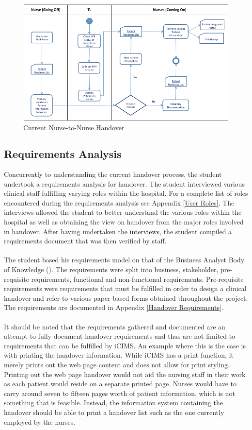\begin{figure}[hp]
				\centering
				\includegraphics[angle=-90,scale=1.0, width=120mm]{Images/Nurse-to-Nurse-Handover-Process-As-Is}
				\caption{Current Nurse-to-Nurse Handover}
\end{figure} 
\newpage

\subsection{Requirements Analysis}
Concurrently to understanding the current handover process, the student undertook a requirements analysis for handover. The student interviewed various clinical staff fulfilling varying roles within the hospital. For a complete list of roles encountered during the requirements analysis see Appendix \ref{User Roles}. The interviews allowed the student to better understand the various roles within the hospital as well as obtaining the view on handover from the major roles involved in handover. After having undertaken the interviews, the student compiled a requirements document that was then verified by staff. 
\\ \\ 
The student based his requirements model on that of the Business Analyst Body of Knowledge (\cite{IIBA}). The requirements were split into business, stakeholder, pre-requisite requirements, functional and non-functional requirements. Pre-requisite requirements were requirements that must be fulfilled in order to design a clinical handover and refer to various paper based forms obtained throughout the project.  The requirements are documented in Appendix \ref{Handover Requirements}.
\\ \\
It should be noted that the requirements gathered and documented are an attempt to fully document handover requirements and thus are not limited to requirements that can be fulfilled by iCIMS. An example where this is the case is with printing the handover information. While iCIMS has a print function, it merely prints out the web page content and does not allow for print styling. Printing out the web page handover would not aid the nursing staff in their work as each patient would reside on a separate printed page. Nurses would have to carry around seven to fifteen pages worth of patient information, which is not something that is feasible. Instead, the information system containing the handover should be able to print a handover list such as the one currently employed by the nurses.

